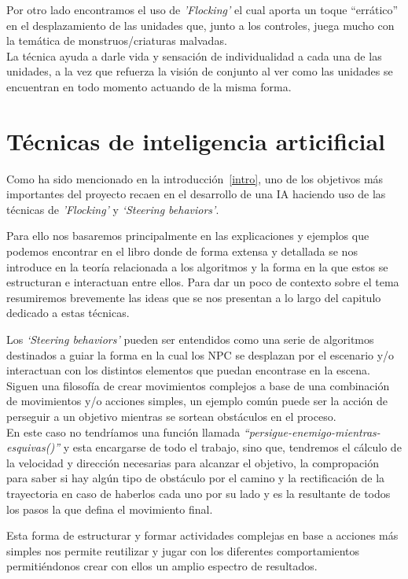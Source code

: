 Por otro lado encontramos el uso de \textit{'Flocking'} el cual aporta un toque ``errático''
en el desplazamiento de las unidades que, junto a los controles, juega mucho con la temática 
de monstruos/criaturas malvadas. \\
La técnica ayuda a darle vida y sensación de individualidad
a cada una de las unidades, a la vez que refuerza la visión de conjunto al ver como las
unidades se encuentran en todo momento actuando de la misma forma. 


\section{Técnicas de inteligencia articificial}
Como ha sido mencionado en la introducción~\ref{intro}, uno de los objetivos más importantes 
del proyecto recaen en el desarrollo de una \ac{IA} haciendo uso de las técnicas de 
\textit{'Flocking'} y \textit{`Steering behaviors'}.

Para ello nos basaremos principalmente en las explicaciones y ejemplos que podemos
encontrar en el libro \cite[ch.~3]{Millington2009} donde de forma extensa y detallada
se nos introduce en la teoría relacionada a los algoritmos y la forma en la que estos
se estructuran e interactuan entre ellos. Para dar un poco de contexto sobre el tema
resumiremos brevemente las ideas que se nos presentan a lo largo del capitulo dedicado
a estas técnicas. 

Los \textit{`Steering behaviors'} pueden ser entendidos como una serie de algoritmos
destinados a guiar la forma en la cual los \ac{NPC} se desplazan por el escenario
y/o interactuan con los distintos elementos que puedan encontrase en la escena. Siguen
una filosofía de crear movimientos complejos a base de una combinación de movimientos 
y/o acciones simples, un ejemplo común puede ser la acción de perseguir a un objetivo
mientras se sortean obstáculos en el proceso. \\ 
En este caso no tendríamos una función llamada 
\textit{``persigue-enemigo-mientras-esquivas()''} y esta encargarse de todo el 
trabajo, sino que, tendremos el cálculo de la velocidad y dirección necesarias para
alcanzar el objetivo, la compropación para saber si hay algún tipo de
obstáculo por el camino y la rectificación de la trayectoria en caso de
haberlos cada uno por su lado y es la resultante de todos los pasos la que defina el
movimiento final.

Esta forma de estructurar y formar actividades complejas en base a acciones más simples
nos permite reutilizar y jugar con los diferentes comportamientos permitiéndonos crear
con ellos un amplio espectro de resultados.

